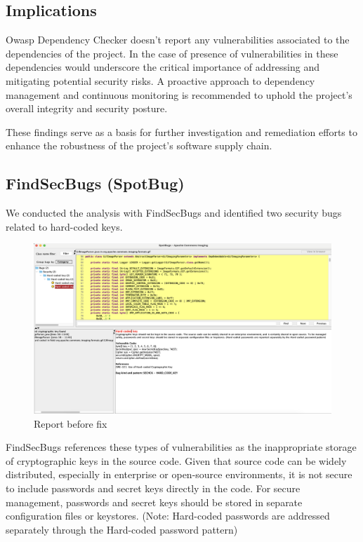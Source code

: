 \documentclass[sigconf]{acmart}
\begin{document}
\subsection{Implications}

Owasp Dependency Checker doesn't report any vulnerabilities associated to the dependencies of the project. In the case of presence of vulnerabilities in these dependencies would underscore the critical importance of addressing and mitigating potential security risks. A proactive approach to dependency management and continuous monitoring is recommended to uphold the project's overall integrity and security posture.

These findings serve as a basis for further investigation and remediation efforts to enhance the robustness of the project's software supply chain.


\subsection{FindSecBugs (SpotBug)}

We conducted the analysis with FindSecBugs and identified two security bugs related to hard-coded keys. 

\begin{figure}[h!]
    \centering
    \includegraphics[width=1\linewidth]{reportFindSecBugs.png}
    \caption{Report before fix}
    \label{fig:enter-label}
\end{figure}

FindSecBugs references these types of vulnerabilities as the inappropriate storage of cryptographic keys in the source code. Given that source code can be widely distributed, especially in enterprise or open-source environments, it is not secure to include passwords and secret keys directly in the code. For secure management, passwords and secret keys should be stored in separate configuration files or keystores. (Note: Hard-coded passwords are addressed separately through the Hard-coded password pattern)
\end{document}
